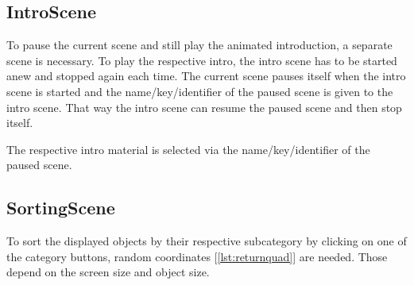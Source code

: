 \subsection{IntroScene}\label{subsec:introscene}
To pause the current scene and still play the animated introduction, a separate scene is necessary.
To play the respective intro, the intro scene has to be started anew and stopped again each time.
The current scene pauses itself when the intro scene is started and the name/key/identifier
of the paused scene is given to the intro scene.
That way the intro scene can resume the paused scene and then stop itself.

The respective intro material is selected via the name/key/identifier of the paused scene.

\subsection{SortingScene}\label{subsec:sortingscene}
To sort the displayed objects by their respective subcategory by clicking on one of the category buttons,
random coordinates [\ref{lst:returnquad}] are needed.
Those depend on the screen size and object size.


